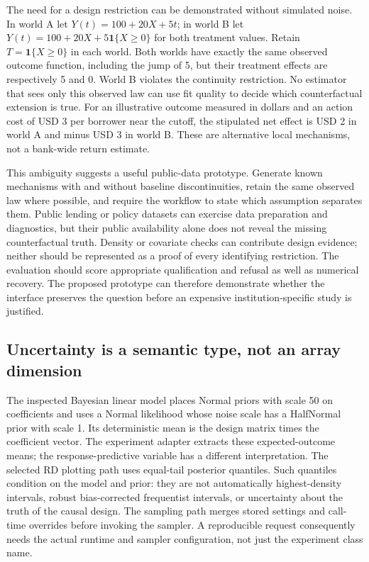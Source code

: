 The need for a design restriction can be demonstrated without simulated noise.
In world A let $Y(t)=100+20X+5t$; in world B let
$Y(t)=100+20X+5\mathbf{1}\{X\geq0\}$ for both treatment values. Retain
$T=\mathbf{1}\{X\geq0\}$ in each world. Both worlds have exactly the same
observed outcome function, including the jump of 5, but their treatment effects
are respectively 5 and 0. World B violates the continuity restriction. No
estimator that sees only this observed law can use fit quality to decide which
counterfactual extension is true. For an illustrative outcome measured in dollars
and an action cost of USD 3 per borrower near the cutoff, the stipulated net
effect is USD 2 in world A and minus USD 3 in world B. These are alternative
local mechanisms, not a bank-wide return estimate.\citep{exec14_causalpy_exact}

This ambiguity suggests a useful public-data prototype. Generate known mechanisms
with and without baseline discontinuities, retain the same observed law where
possible, and require the workflow to state which assumption separates them.
Public lending or policy datasets can exercise data preparation and diagnostics,
but their public availability alone does not reveal the missing counterfactual
truth. Density or covariate checks can contribute design evidence; neither should
be represented as a proof of every identifying restriction. The evaluation should
score appropriate qualification and refusal as well as numerical recovery.
The proposed prototype can therefore demonstrate whether the interface preserves
the question before an expensive institution-specific study is justified.
\citep{exec14_causalpy_decision}

\subsection{Uncertainty is a semantic type, not an array dimension}

The inspected Bayesian linear model places Normal priors with scale 50 on
coefficients and uses a Normal likelihood whose noise scale has a HalfNormal
prior with scale 1. Its deterministic mean is the design matrix times the
coefficient vector. The experiment adapter extracts these expected-outcome means;
the response-predictive variable has a different interpretation. The selected RD
plotting path uses equal-tail posterior quantiles. Such quantiles condition on the
model and prior: they are not automatically highest-density intervals, robust
bias-corrected frequentist intervals, or uncertainty about the truth of the causal
design. The sampling path merges stored settings and call-time overrides before
invoking the sampler. A reproducible request consequently needs the actual runtime
and sampler configuration, not just the experiment class name.
\citep{exec14_causalpy_primary}

